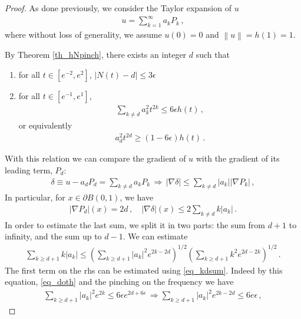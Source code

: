 \documentclass[11pt]{article}
\begin{document}
\begin{proof}
As done previously, we consider the Taylor expansion of $u$
\begin{gather}
 u= \sum_{k=1}^\infty a_k P_k\, ,
\end{gather}
where without loss of generality, we assume $u(0)=0$ and ${\left\|{u}\right\|}=h(1)=1$.

By Theorem \ref{th_hNpinch}, there exists an integer $d$ such that
 \begin{enumerate}
  \item for all $t\in [e^{-2}, e^2]$, ${\left|{ N(t)-d}\right|}\leq 3\epsilon$
  \item for all $t\in [e^{-1}, e^1]$,
   \begin{gather}\label{eq_kdsum}
    \sum_{k\neq d} a_k^2 t^{2k} \leq 6\epsilon h(t)\, ,
   \end{gather}
  or equivalently
   \begin{gather}
    a_d^2 t^{2d} \geq (1-6\epsilon )h(t)\, .
   \end{gather}
 \end{enumerate}
With this relation we can compare the gradient of $u$ with the gradient of its leading term, $P_d$:
\begin{gather}
 \delta \equiv u-a_d P_d = \sum_{k\neq d} a_k P_k \, \Longrightarrow \, {\left|{\nabla \delta}\right|} \leq \sum_{k\neq d} {\left|{a_k}\right|} {\left|{\nabla P_k}\right|} \, ,
\end{gather}
In particular, for $x\in \partial B(0,1)$, we have
\begin{gather}
 {\left|{\nabla P_d}\right|}(x) = 2d\, , \quad {\left|{\nabla \delta}\right|}(x) \leq 2 \sum_{k\neq d} k{\left|{a_k}\right|}\, . 
\end{gather}
In order to estimate the last sum, we split it in two parts: the sum from $d+1$ to infinity, and the sum up to $d-1$. We can estimate
\begin{gather}
 \sum_{k\geq d+1} k{\left|{a_k}\right|} \leq {\left({\sum_{k\geq d+1} {\left|{a_k}\right|}^2 e^{2k-2d} }\right)}^{1/2}{\left({\sum_{k\geq d+1} k^2e^{2d-2k}  }\right)}^{1/2}\, .
\end{gather}
The first term on the rhs can be estimated using \eqref{eq_kdsum}. Indeed by this equation, \eqref{eq_doth} and the pinching on the frequency we have
\begin{gather}
 \sum_{k\geq d+1} {\left|{a_k}\right|}^2 e^{2k} \leq 6\epsilon e^{2d+6\epsilon} \, \Longrightarrow   \sum_{k\geq d+1} {\left|{a_k}\right|}^2 e^{2k-2d} \leq 6e\epsilon\, ,
\end{gather}

\end{proof}
\end{document}
